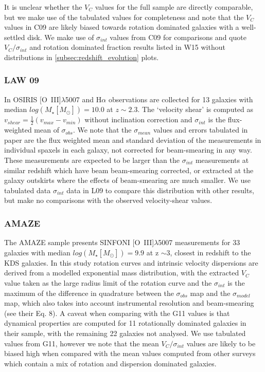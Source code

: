 \documentclass[fleqn,usenatbib]{mn2e}
\begin{document}
It is unclear whether the $V_{C}$ values for the full sample are directly comparable, but we make use of the tabulated values for completeness and note that the $V_{C}$ values in C09 are likely biased towards rotation dominated galaxies with a well-settled disk.
We make use of $\sigma_{int}$ values from C09 for comparisons and quote $V_{C}/\sigma_{int}$ and rotation dominated fraction results listed in W15 without distributions in \cref{subsec:redshift_evolution} plots.

\subsubsection{LAW 09}\label{subsubsec:law_09}
In \cite[L09]{Law2009} OSIRIS [O~{\sc III}]$\lambda$5007 and H$\alpha$ observations are collected for 13 galaxies with median $log(M_{\star}[M_{\odot}])=10.0$ at $z\sim2.3$.
The `velocity shear' is computed as $v_{shear} = \frac{1}{2}(v_{max} - v_{min})$ without inclination correction and $\sigma_{int}$ is the flux-weighted mean of $\sigma_{obs}$.
We note that the $\sigma_{mean}$ values and errors tabulated in \cite{Law2009} paper are the flux weighted mean and standard deviation of the measurements in individual spaxels in each galaxy, not corrected for beam-smearing in any way.
These measurements are expected to be larger than the $\sigma_{int}$ measurements at similar redshift which have beam beam-smearing corrected, or extracted at the galaxy outskirts where the effects of beam-smearing are much smaller.
We use tabulated data $\sigma_{int}$ data in L09 to compare this distribution with other results, but make no comparisons with the observed velocity-shear values.

\subsubsection{AMAZE}\label{subsubsec:AMAZE}
The AMAZE sample \cite[G11]{Gnerucci2011} presents SINFONI [O~{\sc III}]$\lambda$5007 measurements for 33 galaxies with median $log(M_{\star}[M_{\odot}])=9.9$ at z $\sim 3$, closest in redshift to the KDS galaxies.
In this study rotation curves and intrinsic velocity dispersions are derived from a modelled exponential mass distribution, with the extracted $V_{C}$ value taken as the large radius limit of the rotation curve and the $\sigma_{int}$ is the maximum of the difference in quadrature between the $\sigma_{obs}$ map and the $\sigma_{model}$ map, which also takes into account instrumental resolution and beam-smearing (see their Eq. 8).
A caveat when comparing with the G11 values is that dynamical properties are computed for 11 rotationally dominated galaxies in their sample, with the remaining 22 galaxies not analysed.
We use tabulated values from G11, however we note that the mean $V_{C}/\sigma_{int}$ values are likely to be biased high when compared with the mean values computed from other surveys which contain a mix of rotation and dispersion dominated galaxies. \\
\end{document}
